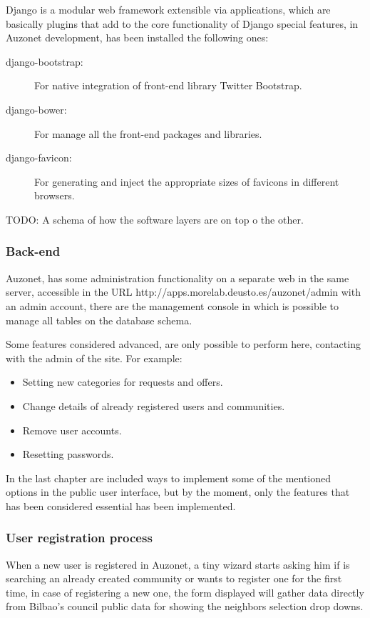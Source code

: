 \documentclass{DeustoFDP}
\begin{document}
Django is a modular web framework extensible via applications, which are basically plugins that add to the core functionality of Django special features, in Auzonet development, has been installed the following ones:

\begin{description}
	\item[django-bootstrap:] For native integration of front-end library Twitter Bootstrap.
	\item[django-bower:] For manage all the front-end packages and libraries.
	\item[django-favicon:] For generating and inject the appropriate sizes of favicons in different browsers. 
\end{description}

TODO: A schema of how the software layers are on top o the other.

\subsubsection{Back-end}
Auzonet, has some administration functionality on a separate web in the same server, accessible in the URL http://apps.morelab.deusto.es/auzonet/admin with an admin account, there are the management console in which is possible to manage all tables on the database schema.

Some features considered advanced, are only possible to perform here, contacting with the admin of the site. For example:

\begin{itemize}
	\item Setting new categories for requests and offers.
	\item Change details of already registered users and communities.
	\item Remove user accounts.
	\item Resetting passwords.
\end{itemize}

In the last chapter are included ways to implement some of the mentioned options in the public user interface, but by the moment, only the features that has been considered essential has been implemented.

\subsubsection{User registration process}
When a new user is registered in Auzonet, a tiny wizard starts asking him if is searching an already created community or wants to register one for the first time, in case of registering a new one, the form displayed will gather data directly from Bilbao's council public data for showing the neighbors selection drop downs.
\end{document}
